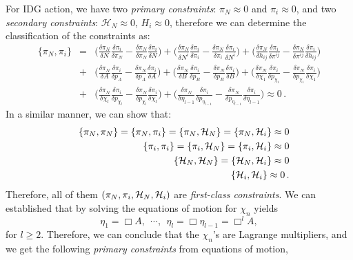 \documentclass[a4paper,12pt]{article}
\newcommand{\cH}{{\cal H}}
\newcommand{\+}{^{\dagger}}
\newcommand{\2}{\frac{1}{2}}
\newcommand{\3}{\frac{1}{3}}
\newcommand{\4}{\frac{1}{4}}
\newcommand{\6}{\frac{1}{6}}
\newcommand{\8}{\frac{1}{8}}
\begin{document}
 
 For IDG action,  we have two {\it primary constraints}: $\pi_N\approx0$ and $\pi_i\approx0$,  and two {\it secondary constraints}: $\mathcal{H}_{N}\approx0$, $H_{i}\approx0$, therefore we can determine the classification of the constraints as:
\begin{eqnarray}
\{\pi_N,\pi_i\}&=&\Bigg(\frac{\delta \pi_N}{\delta N_{}}\frac{\delta \pi_i}{\delta
\pi_N}-\frac{\delta \pi_N}{\delta
\pi_N}\frac{\delta \pi_i}{\delta N}\Bigg)+\Bigg(\frac{\delta \pi_N}{\delta N^{i}_{}}\frac{\delta \pi_i}{\delta
\pi_i}-\frac{\delta \pi_N}{\delta
\pi_i}\frac{\delta \pi_i}{\delta N^{i}}\Bigg) 
+\Bigg(\frac{\delta \pi_N}{\delta h_{ij}}\frac{\delta \pi_i}{\delta
\pi^{ij}}-\frac{\delta \pi_N}{\delta
\pi^{ij}}\frac{\delta \pi_i}{\delta h_{ij}}\Bigg)\nonumber\\
&+&\Bigg(\frac{\delta \pi_N}{\delta A}\frac{\delta \pi_i}{\delta
p_{A}}-\frac{\delta \pi_N}{\delta
p_{A}}\frac{\delta \pi_i}{\delta A}\Bigg)+\Bigg(\frac{\delta \pi_N}{\delta B}\frac{\delta \pi_i}{\delta
p_{B}}-\frac{\delta \pi_N}{\delta
p_{B}}\frac{\delta \pi_i}{\delta B}\Bigg)+\Bigg(\frac{\delta \pi_N}{\delta \chi_1}\frac{\delta \pi_i}{\delta
p_{\chi_1}}-\frac{\delta \pi_N}{\delta
p_{\chi_1}}\frac{\delta \pi_i}{\delta \chi_1}\Bigg)\nonumber\\
&+&\Bigg(\frac{\delta \pi_N}{\delta \chi_l}\frac{\delta \pi_i}{\delta
p_{\chi_l}}-\frac{\delta \pi_N}{\delta
p_{\chi_l}}\frac{\delta \pi_i}{\delta \chi_l}\Bigg)+\Bigg(\frac{\delta \pi_N}{\delta \eta_{l-1}}\frac{\delta \pi_i}{\delta
p_{\eta_{l-1}}}-\frac{\delta \pi_N}{\delta
p_{\eta_{l-1}}}\frac{\delta \pi_i}{\delta \eta_{l-1}}\Bigg)\approx 0\,.
\end{eqnarray}
In a similar manner, we can show that: 
\begin{eqnarray}
&&\{\pi_N,\pi_N\}=\{\pi_N,\pi_i\}=\{\pi_N,\mathcal{H}_{N}\}=\{\pi_N,\cH_{i}\}\approx0\nonumber\\
&&\{\pi_i,\pi_i\}=\{\pi_i,\mathcal{H}_{N}\}=\{\pi_i,\cH_{i}\}\approx0\nonumber\\
&&\{\mathcal{H}_{N},\mathcal{H}_{N}\}=\{\mathcal{H}_{N},\cH_{i}\}\approx0\nonumber\\
&&\{\cH_{i},\cH_{i}\}\approx 0\,.
\end{eqnarray}
Therefore, all of them $(\pi_N,\pi_i,\mathcal{H}_{N},\cH_{i})$ are {\it first-class constraints}. 
We can established that by solving the 
equations of motion for $\chi_n$ yields 
$$\eta_{1}=\Box A,~~\cdots,~~\eta_l=\Box \eta_{l-1}=\Box^{l}A, $$ for $l \geq 2$. Therefore, we can conclude that the $\chi_n$'s are 
Lagrange multipliers, and we get the following {\it primary constraints} from equations of motion, 
\end{document}
